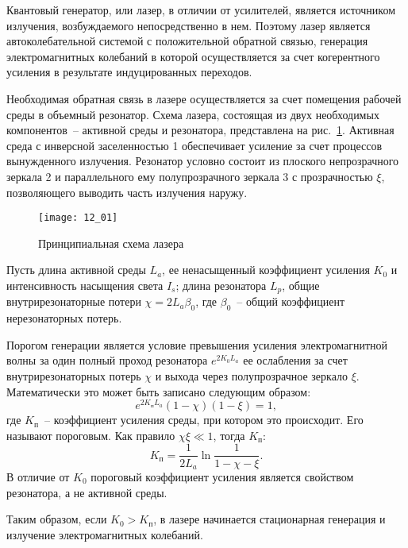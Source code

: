 
Квантовый генератор, или лазер, в отличии от усилителей, является источником
излучения, возбуждаемого непосредственно в нем. Поэтому лазер является
автоколебательной системой с положительной обратной связью, генерация
электромагнитных колебаний в которой осуществляется за счет когерентного
усиления в результате индуцированных переходов.

Необходимая обратная связь в лазере осуществляется за счет помещения рабочей
среды в объемный резонатор. Схема лазера, состоящая из двух необходимых
компонентов~-- активной среды и резонатора, представлена на рис.~\ref{pic12.1}.
Активная среда с инверсной заселенностью 1 обеспечивает усиление за счет
процессов вынужденного излучения. Резонатор условно состоит из плоского
непрозрачного зеркала 2 и параллельного ему полупрозрачного зеркала 3 с
прозрачностью \( \xi \), позволяющего выводить часть излучения наружу.

\begin{figure}[h!]
  \center
  \texttt{[image: 12\_01]}
  \caption{Принципиальная схема лазера}
  \label{pic12.1}
\end{figure}

Пусть длина активной среды \( L_a \), ее ненасыщенный коэффициент усиления
\( K_0 \) и интенсивность насыщения света \( I_s \); длина резонатора \( L_p \),
общие внутрирезонаторные потери \( \chi = 2L_a\beta_0 \), где \( \beta_0 \)~--
общий коэффициент нерезонаторных потерь.

Порогом генерации является условие превышения усиления электромагнитной волны за
один полный проход резонатора \( e^{2K_0 L_a} \) ее ослабления за счет
внутрирезонаторных потерь \( \chi \) и выхода через полупрозрачное зеркало
\( \xi \). Математически это может быть записано следующим образом:
\[
  e^{2K_\text{п} L_a}(1 - \chi)(1 - \xi) = 1,
\]
где \( K_\text{п} \)~-- коэффициент усиления среды, при котором это происходит.
Его называют пороговым. Как правило \( \chi\xi \ll 1 \), тогда \( K_\text{п} \):
\[
  K_\text{п} = \frac{1}{2L_a}\ln\frac{1}{1 - \chi - \xi}.
\]
В отличие от \( K_0 \) пороговый коэффициент усиления является свойством
резонатора, а не активной среды.

Таким образом, если \( K_0 > K_\text{п} \), в лазере начинается стационарная
генерация и излучение электромагнитных колебаний.
